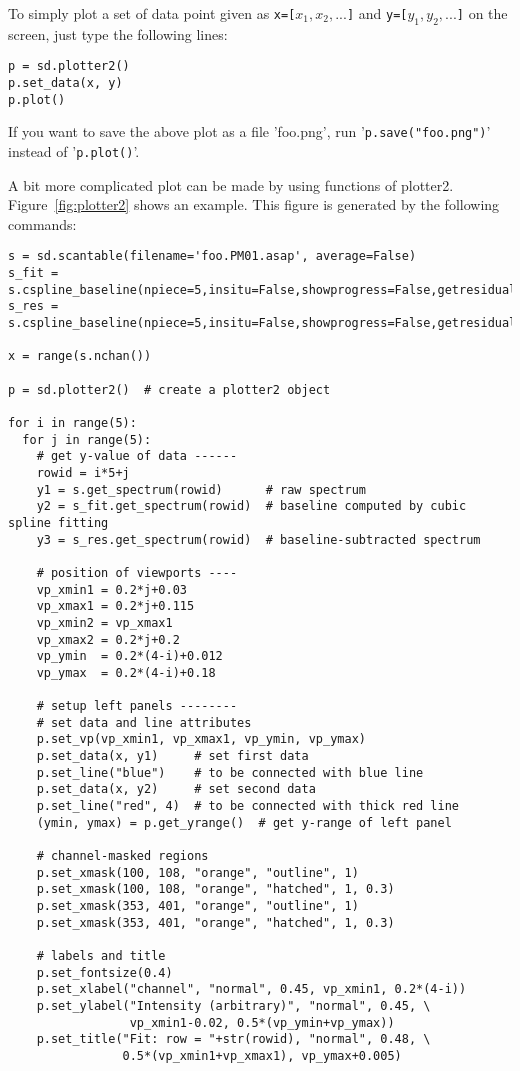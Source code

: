 To simply plot a set of data point given as {\tt x=[}$ x_1, x_2, ...${\tt ]} and {\tt y=[}$ y_1, y_2, ...${\tt ]} on the screen, just type the following lines: 

\small
\begin{verbatim}
p = sd.plotter2()
p.set_data(x, y)
p.plot()
\end{verbatim}
\normalsize

If you want to save the above plot as a file 'foo.png', run '{\tt p.save("foo.png")}' instead of '{\tt p.plot()}'. 

A bit more complicated plot can be made by using functions of plotter2. Figure~\ref{fig:plotter2} shows an example. This figure is generated by the following commands: 

\small
\begin{verbatim}
s = sd.scantable(filename='foo.PM01.asap', average=False)
s_fit = s.cspline_baseline(npiece=5,insitu=False,showprogress=False,getresidual=False)
s_res = s.cspline_baseline(npiece=5,insitu=False,showprogress=False,getresidual=True)

x = range(s.nchan())

p = sd.plotter2()  # create a plotter2 object

for i in range(5):
  for j in range(5):
    # get y-value of data ------
    rowid = i*5+j
    y1 = s.get_spectrum(rowid)      # raw spectrum
    y2 = s_fit.get_spectrum(rowid)  # baseline computed by cubic spline fitting
    y3 = s_res.get_spectrum(rowid)  # baseline-subtracted spectrum

    # position of viewports ----
    vp_xmin1 = 0.2*j+0.03
    vp_xmax1 = 0.2*j+0.115
    vp_xmin2 = vp_xmax1
    vp_xmax2 = 0.2*j+0.2
    vp_ymin  = 0.2*(4-i)+0.012
    vp_ymax  = 0.2*(4-i)+0.18

    # setup left panels --------
    # set data and line attributes
    p.set_vp(vp_xmin1, vp_xmax1, vp_ymin, vp_ymax)
    p.set_data(x, y1)     # set first data
    p.set_line("blue")    # to be connected with blue line
    p.set_data(x, y2)     # set second data
    p.set_line("red", 4)  # to be connected with thick red line
    (ymin, ymax) = p.get_yrange()  # get y-range of left panel

    # channel-masked regions
    p.set_xmask(100, 108, "orange", "outline", 1)
    p.set_xmask(100, 108, "orange", "hatched", 1, 0.3)
    p.set_xmask(353, 401, "orange", "outline", 1)
    p.set_xmask(353, 401, "orange", "hatched", 1, 0.3)

    # labels and title
    p.set_fontsize(0.4)
    p.set_xlabel("channel", "normal", 0.45, vp_xmin1, 0.2*(4-i))
    p.set_ylabel("Intensity (arbitrary)", "normal", 0.45, \
                 vp_xmin1-0.02, 0.5*(vp_ymin+vp_ymax))
    p.set_title("Fit: row = "+str(rowid), "normal", 0.48, \
                0.5*(vp_xmin1+vp_xmax1), vp_ymax+0.005)


\end{verbatim}
